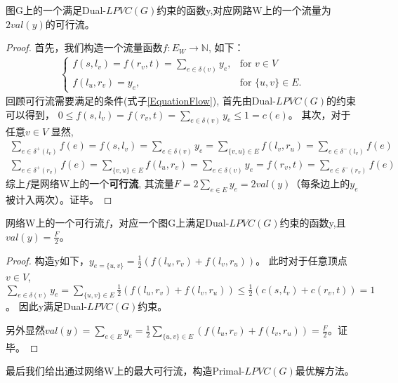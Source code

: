 \begin{property}
图G上的一个满足Dual-$LPVC(G)$约束的函数y,对应网路W上的一个流量为$2val(y)$的可行流。
\end{property}
\begin{proof}
  首先，我们构造一个流量函数$f:E_W \rightarrow \mathbb{N}$, 如下：
  \begin{equation*}\begin{aligned} \begin{cases}
    f(s, l_v) = f(r_v, t) = \sum\limits_{e \in \delta(v)}{y_e}, & \mbox{for } v \in V \\
    f(l_u, r_v) = y_e, & \mbox{for } \{u, v\} \in E.
  \end{cases}\end{aligned}\end{equation*}
  回顾可行流需要满足的条件(式子\ref{EquationFlow}), 首先由Dual-$LPVC(G)$的约束可以得到，
  $0 \le f(s, l_v) = f(r_v, t) = \sum\limits_{e \in \delta(v)}{y_e} \le 1 = c(e)$。
  其次，对于任意$v \in V$ 显然,
  \[ \begin{aligned}
     \sum_{e\in \delta^+(l_v)}{f(e)} = f(s, l_v) = \sum\limits_{e \in \delta(v)}{y_e} = \sum_{\{v, u\} \in E}{f(l_v, r_u)} = \sum_{e\in \delta^-(l_v)}{f(e)} \\
    \sum_{e\in \delta^+(r_v)}{f(e)} = \sum_{\{v, u\} \in E}{f(l_u, r_v)}  = \sum\limits_{e \in \delta(v)}{y_e} = f(r_v, t) = \sum_{e\in \delta^-(r_v)}{f(e)}
  \end{aligned} \]
  综上$f$是网络W上的一个\textbf{可行流}, 其流量$F = 2\sum_{e \in E}{y_e} = 2val(y)$（每条边上的$y_e$被计入两次）。证毕。
\end{proof}

\begin{property}
网络W上的一个可行流$f$，对应一个图G上满足Dual-$LPVC(G)$约束的函数y,且$val(y) = \frac{F}{2}$。
\end{property}
\begin{proof}
构造y如下，$y_{e = \{u, v\}} = \frac{1}{2}(f(l_u, r_v) + f(l_v, r_u))$。
此时对于任意顶点$v \in V$, $\sum\limits_{e \in \delta(v)}{y_e} = \sum\limits_{\{u, v\}\in E}{\frac{1}{2}(f(l_u, r_v) + f(l_v, r_u))} \le \frac{1}{2}(c(s, l_v) + c(r_v, t)) = 1$。
因此y满足Dual-$LPVC(G)$约束。

另外显然$val(y) = \sum_{e \in E}{y_e} = \frac{1}{2}\sum\limits_{\{u, v\}\in E}{(f(l_u, r_v) + f(l_v, r_u))} = \frac{F}{2}$。证毕。
\end{proof}

最后我们给出通过网络W上的最大可行流，构造Primal-$LPVC(G)$最优解方法。

